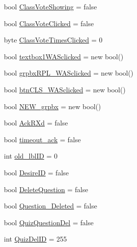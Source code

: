 \begin{DoxyCompactItemize}
\item 
bool \hyperlink{class_sr_p___classroom_inq_1_1frm_classrrom_inq_ae23aa3324c19688aa8d35b0217cf9605}{\-Class\-Vote\-Showing} = false
\item 
bool \hyperlink{class_sr_p___classroom_inq_1_1frm_classrrom_inq_a1e2c8341b4d2988c61648bea9a4c412b}{\-Class\-Vote\-Clicked} = false
\item 
byte \hyperlink{class_sr_p___classroom_inq_1_1frm_classrrom_inq_ab63c943c019363dba6aa86686b9f2bf6}{\-Class\-Vote\-Times\-Clicked} = 0
\item 
bool \hyperlink{class_sr_p___classroom_inq_1_1frm_classrrom_inq_a998e499144884577e3445f4b721b4c6a}{textbox1\-W\-A\-Sclicked} = new bool()
\item 
bool \hyperlink{class_sr_p___classroom_inq_1_1frm_classrrom_inq_a97ab9f8512cd6b2f9648651d5c5d404b}{grpbx\-R\-P\-L\-\_\-\-W\-A\-Sclicked} = new bool()
\item 
bool \hyperlink{class_sr_p___classroom_inq_1_1frm_classrrom_inq_aed9d1ad7c4e2b196997c1820ac2cdb4d}{btn\-C\-L\-S\-\_\-\-W\-A\-Sclicked} = new bool()
\item 
bool \hyperlink{class_sr_p___classroom_inq_1_1frm_classrrom_inq_aaf5a152b29ae06c11e8e25f0eabf454d}{\-N\-E\-W\-\_\-grpbx} = new bool()
\item 
bool \hyperlink{class_sr_p___classroom_inq_1_1frm_classrrom_inq_a65b6633a5bc7bff8142fcace6bfba3f8}{\-Ack\-R\-Xd} = false
\item 
bool \hyperlink{class_sr_p___classroom_inq_1_1frm_classrrom_inq_a64cde7d8ac96b5122de783724c58103a}{timeout\-\_\-ack} = false
\item 
int \hyperlink{class_sr_p___classroom_inq_1_1frm_classrrom_inq_ac56e0f039ce0113331d9bdd322b30827}{old\-\_\-lbl\-I\-D} = 0
\item 
bool \hyperlink{class_sr_p___classroom_inq_1_1frm_classrrom_inq_aad36cc9a93fb79969dd3b0d0fe52b793}{\-Desire\-I\-D} = false
\item 
bool \hyperlink{class_sr_p___classroom_inq_1_1frm_classrrom_inq_ab3a8803fac827da5757e7451c1836010}{\-Delete\-Question} = false
\item 
bool \hyperlink{class_sr_p___classroom_inq_1_1frm_classrrom_inq_a8f54ae3a0ea7bb9dafed984a53155fd8}{\-Question\-\_\-\-Deleted} = false
\item 
bool \hyperlink{class_sr_p___classroom_inq_1_1frm_classrrom_inq_aa1c6ba1dda756081aba5b3cfea87b09d}{\-Quiz\-Question\-Del} = false
\item 
int \hyperlink{class_sr_p___classroom_inq_1_1frm_classrrom_inq_a2221a860fdb3bc2837b3ca3c0cee182c}{\-Quiz\-Del\-I\-D} = 255

\end{DoxyCompactItemize}

